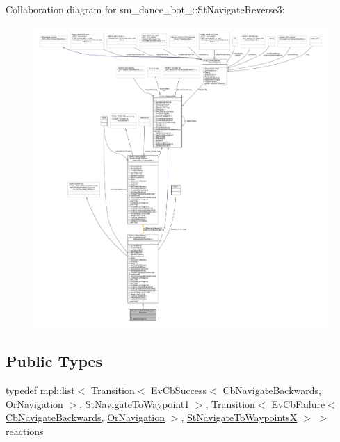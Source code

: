 Collaboration diagram for sm\+\_\+dance\+\_\+bot\+\_\+:\+:St\+Navigate\+Reverse3\+:
\nopagebreak
\begin{figure}[H]
\begin{center}
\leavevmode
\includegraphics[width=350pt]{structsm__dance__bot__2_1_1StNavigateReverse3__coll__graph}
\end{center}
\end{figure}
\subsection*{Public Types}
\begin{DoxyCompactItemize}
\item 
typedef mpl\+::list$<$ Transition$<$ Ev\+Cb\+Success$<$ \hyperlink{classcl__move__base__z_1_1CbNavigateBackwards}{Cb\+Navigate\+Backwards}, \hyperlink{classsm__dance__bot__2_1_1OrNavigation}{Or\+Navigation} $>$, \hyperlink{structsm__dance__bot__2_1_1StNavigateToWaypoint1}{St\+Navigate\+To\+Waypoint1} $>$, Transition$<$ Ev\+Cb\+Failure$<$ \hyperlink{classcl__move__base__z_1_1CbNavigateBackwards}{Cb\+Navigate\+Backwards}, \hyperlink{classsm__dance__bot__2_1_1OrNavigation}{Or\+Navigation} $>$, \hyperlink{structsm__dance__bot__2_1_1StNavigateToWaypointsX}{St\+Navigate\+To\+WaypointsX} $>$ $>$ \hyperlink{structsm__dance__bot__2_1_1StNavigateReverse3_a58a69b307b60ea7f7fb92d5e61feb7de}{reactions}
\end{DoxyCompactItemize}
